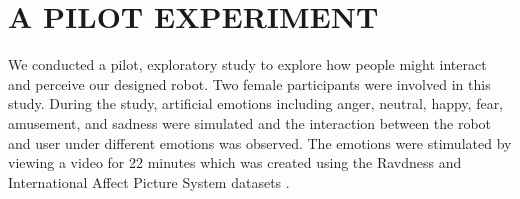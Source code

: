 \documentclass[letterpaper, 10 pt, conference]{ieeeconf}  %
\begin{document}


\section{A PILOT EXPERIMENT}
We conducted a pilot, exploratory study to explore how people might interact and perceive our designed robot. Two female participants were involved in this study. During the study, artificial emotions including anger, neutral, happy, fear, amusement, and sadness were simulated and the interaction between the robot and user under different emotions was observed. 
The emotions were stimulated by viewing a video for 22 minutes which was created using the Ravdness and International Affect Picture System datasets \cite{d1}. 

\end{document}
